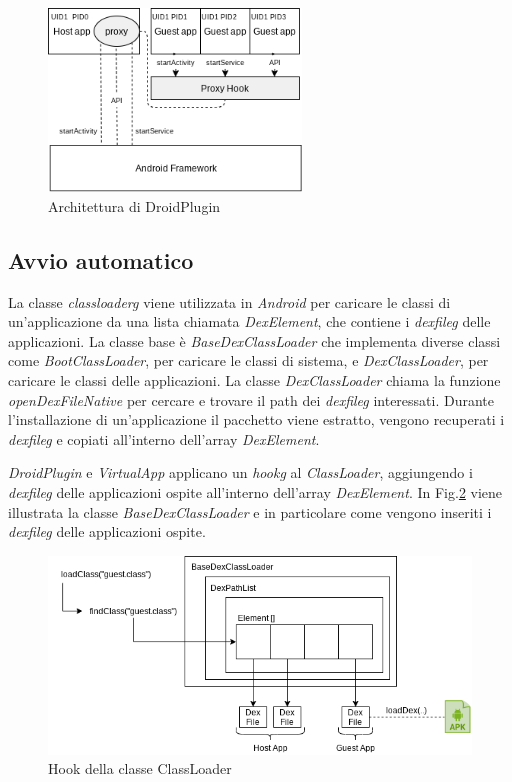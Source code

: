 \begin{figure} [H]
\centering
\includegraphics[width=0.6\textwidth]{figures/droidplugin}
\caption[Architettura di DroidPlugin]{Architettura di DroidPlugin
\label{fig:droidplugin}}
\end{figure}

\subsection*{Avvio automatico}

La classe \emph{\gls{classloaderg}} viene utilizzata in \emph{Android} per caricare le classi di un'applicazione da una lista chiamata \emph{DexElement}, che contiene i \emph{\gls{dexfileg}} delle applicazioni. La classe base è \emph{BaseDexClassLoader} che implementa diverse classi come \emph{BootClassLoader}, per caricare le classi di sistema, e \emph{DexClassLoader}, per caricare le classi delle applicazioni.
La classe \emph{DexClassLoader} chiama la funzione \emph{openDexFileNative} per cercare e trovare il path dei \emph{\gls{dexfileg}} interessati. Durante l'installazione di un'applicazione il pacchetto viene estratto, vengono recuperati i \emph{\gls{dexfileg}} e copiati all'interno dell'array \emph{DexElement}.

\emph{DroidPlugin} e \emph{VirtualApp} applicano un \emph{\gls{hookg}} al \emph{ClassLoader}, aggiungendo i \emph{\gls{dexfileg}} delle applicazioni ospite all'interno dell'array \emph{DexElement}. 
In Fig.\ref{fig:BaseDexClassLoader} viene illustrata la classe \emph{BaseDexClassLoader} e in particolare come vengono inseriti i \emph{\gls{dexfileg}} delle applicazioni ospite.

\begin{figure} [H]
\includegraphics[width=\textwidth]{figures/BaseDexClassLoader}
\caption[Hook della classe ClassLoader]{Hook della classe ClassLoader
\label{fig:BaseDexClassLoader}}
\end{figure}

